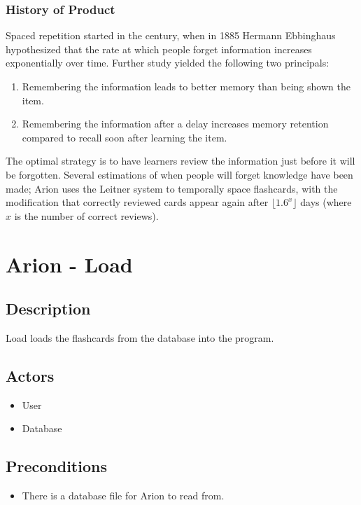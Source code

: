 \documentclass{scrreprt}
\begin{document}
\subsection{History of Product}
Spaced repetition started in the  century, when in 1885 Hermann Ebbinghaus
hypothesized that the rate at which people forget information increases exponentially
over time. Further study yielded the following two principals:
\begin{enumerate}[1.]
    \item Remembering the information leads to better memory than being shown the item.
    \item Remembering the information after a delay increases memory retention compared
        to recall soon after learning the item.
\end{enumerate}
The optimal strategy is to have learners review the information just before it will
be forgotten. Several estimations of when people will forget knowledge have been made;
Arion uses the Leitner system to temporally space flashcards, with the modification that
correctly reviewed cards appear again after $\lfloor 1.6^x \rfloor$ days
(where $x$ is the number of correct reviews).

\setcounter{chapter}{0} %

\chapter{Arion - Load}

\section{Description}
Load loads the flashcards from the database into the program.

\section{Actors}
\begin{itemize}
    \item User
    \item Database
\end{itemize}

\section{Preconditions}
\begin{itemize}
    \item There is a database file for Arion to read from.
\end{itemize}
\end{document}
